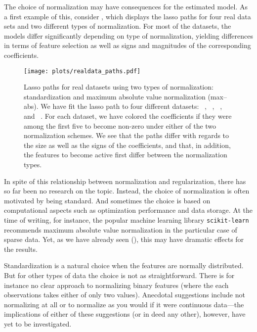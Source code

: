 The choice of normalization may have consequences for the estimated model. As a first
example of this, consider , which displays the lasso paths for
four real data sets and two different types of normalization. For most of the datasets, the
models differ significantly depending on type of normalization, yielding differences in
terms of feature selection as well as signs and magnitudes of the corresponding
coefficients.

\begin{figure}[bpt]
  \centering
  \texttt{[image: plots/realdata\_paths.pdf]}
  \caption{%
    Lasso paths for real datasets using two types of normalization:
    standardization and maximum absolute value normalization (max--abs). We have fit
    the lasso path to four different datasets:
    ~\citep{harrison1978}, ~\citep{golub1999},
    ~\citep{king}, and ~\citep{platt1998}. For each
    dataset, we have colored the coefficients if they were among the first five
    to become non-zero under either of the two normalization schemes. We see
    that the paths differ with regards to the size as well as the signs of the
    coefficients, and that, in addition, the features to become active first
    differ between the normalization types.
  }
  \label{fig:realdata-paths}
\end{figure}

In spite of this relationship between normalization and regularization, there has so far
been no research on the topic. Instead, the choice of normalization is often motivated by
being standard. And sometimes the choice is based on computational aspects such as
optimization performance and data storage. At the time of writing, for instance, the
popular machine learning library \texttt{scikit-learn}~\citep{scikit-learndevelopers2024}
recommends maximum absolute value normalization in the particular case of sparse data. Yet,
as we have already seen (), this may have dramatic effects for the
results.

Standardization is a natural choice when the features are normally distributed. But for
other types of data the choice is not as straightforward. There is for instance no clear
approach to normalizing binary features (where the each observations takes either of only
two values). Anecdotal suggestions include not normalizing at all or to normalize as you
would if it were continuous data---the implications of either of these suggestions (or in
deed any other), however, have yet to be investigated.

